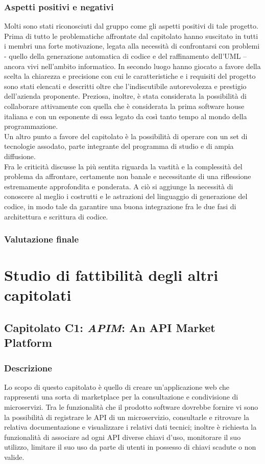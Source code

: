 		\subsubsection{Aspetti positivi e negativi}
		Molti sono stati riconosciuti dal gruppo come gli aspetti positivi di tale progetto.
		\\Prima di tutto le problematiche affrontate dal capitolato hanno suscitato in tutti i membri una forte motivazione, legata alla necessità di confrontarsi 
		con problemi - quello della generazione automatica di codice e del raffinamento dell'UML – ancora vivi nell'ambito informatico. In secondo luogo hanno giocato 
		a favore della scelta la chiarezza e precisione con cui le caratteristiche e i requisiti del progetto sono stati elencati e descritti oltre che l'indiscutibile 
		autorevolezza e prestigio dell'azienda proponente. Preziosa, inoltre, è stata considerata la possibilità di collaborare attivamente con quella che è considerata 
		la prima software house italiana e con un esponente di essa legato da così tanto tempo al mondo della programmazione.
		\\Un altro punto a favore del capitolato è la possibilità di operare con un set di tecnologie assodato, parte integrante del programma di studio e di ampia diffusione.
		\\Fra le criticità discusse la più sentita riguarda la vastità e la complessità del problema da affrontare, certamente non banale e necessitante di una riflessione 
		estremamente approfondita e ponderata. A ciò si aggiunge la necessità di conoscere al meglio i costrutti e le astrazioni del linguaggio di generazione del codice, 
		in modo tale da garantire una buona integrazione fra le due fasi di architettura e scrittura di codice.
		\subsubsection{Valutazione finale}
	
\newpage

\section{Studio di fattibilità degli altri capitolati}
	\subsection{Capitolato C1: \emph{APIM}: An API Market Platform}
		\subsubsection{Descrizione}
		Lo scopo di questo capitolato è quello di creare un'applicazione web che rappresenti una sorta di marketplace per la consultazione e 
		condivisione di microservizi. Tra le funzionalità che il prodotto software dovrebbe fornire vi sono la possibilità di registrare le API 
		di un microservizio, consultarle e ritrovare la relativa documentazione e visualizzare i relativi dati tecnici; inoltre è richiesta la 
		funzionalità di associare ad ogni API diverse chiavi d'uso, monitorare il suo utilizzo, limitare il suo uso da parte di utenti in possesso 
		di chiavi scadute o non valide.
